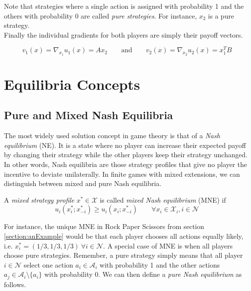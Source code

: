 Note that strategies where a single action is assigned with probability 1 and the others with probability 0 are called \textit{pure strategies}. For instance, $x_2$ is a pure strategy. \\ 

Finally the individual gradients for both players are simply their payoff vectors.

\begin{equation*}
    v_1(x) = \nabla_{x_1}u_1(x) = Ax_2 \qquad \text{and} \qquad v_2(x) = \nabla_{x_2}u_2(x) = x_{1}^{T}B
\end{equation*}


\section{Equilibria Concepts}\label{section:equilibriaConcepts}

\subsection{Pure and Mixed Nash Equilibria}\label{subsection:PNEandMNE}

The most widely used solution concept in game theory is that of a \textit{Nash equilibrium} (NE). It is a state where no player can increase their expected payoff by changing their strategy while the other players keep their strategy unchanged. In other words, Nash equilibria are those strategy profiles that give no player the incentive to deviate unilaterally. In finite games with mixed extensions, we can distinguish between mixed and pure Nash equilibria. 

\begin{definition}\label{def:MNE}
A \textit{mixed strategy profile} $x^* \in \mathcal{X}$ is called \textit{mixed Nash equilibrium} (MNE) if
    \[u_i(x_{i}^{*};x_{-i}^{*}) \ge  u_i(x_{i};x_{-i}^{*}) \qquad \forall x_i \in \mathcal{X}_i, i \in \mathcal{N}\]
\end{definition}

For instance, the unique MNE in Rock Paper Scissors from section \ref{section:anExample} would be that each player chooses all actions equally likely, i.e. $x_{i}^{*} = (1/3,1/3,1/3) \ \forall i \in \mathcal{N}$. A special case of MNE is when all players choose pure strategies. Remember, a pure strategy simply means that all player $i \in \mathcal{N}$ select one action $a_i \in \mathcal{A}_i$ with probability 1 and the other actions $a_j \in \mathcal{A}_i \setminus \{a_i\}$ with probability 0. We can then define a \textit{pure Nash equilibrium} as follows.

